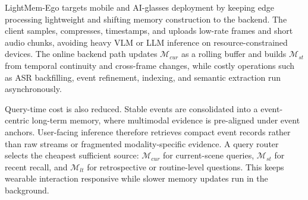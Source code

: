 LightMem-Ego targets mobile and AI-glasses deployment by keeping edge processing lightweight and shifting memory construction to the backend.
The client samples, compresses, timestamps, and uploads low-rate frames and short audio chunks, avoiding heavy VLM or LLM inference on resource-constrained devices.
The online backend path updates \(\mathcal{M}_{cur}\) as a rolling buffer and builds \(\mathcal{M}_{st}\) from temporal continuity and cross-frame changes, while costly operations such as ASR backfilling, event refinement, indexing, and semantic extraction run asynchronously.

Query-time cost is also reduced.
Stable events are consolidated into a event-centric long-term memory, where multimodal evidence is pre-aligned under event anchors.
User-facing inference therefore retrieves compact event records rather than raw streams or fragmented modality-specific evidence.
A query router selects the cheapest sufficient source: \(\mathcal{M}_{cur}\) for current-scene queries, \(\mathcal{M}_{st}\) for recent recall, and \(\mathcal{M}_{lt}\) for retrospective or routine-level questions.
This keeps wearable interaction responsive while slower memory updates run in the background.



